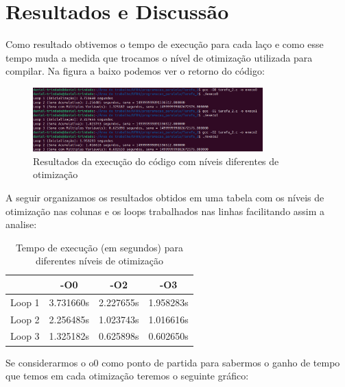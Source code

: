 \documentclass[a4paper, 12pt]{article}
\begin{document}
	\section{Resultados e Discussão}
	
	Como resultado obtivemos o tempo de execução para cada laço e como esse tempo muda a medida que trocamos o nível de otimização utilizada para compilar. Na figura a baixo podemos ver o retorno do código:
	
	\begin{figure}[h]
		\centering
		\includegraphics[width=0.79\textwidth]{resultados.png}
		\caption{Resultados da execução do código com níveis diferentes de otimização}
		\label{figura:exemplo}
	\end{figure}
	
	A seguir organizamos os resultados obtidos em uma tabela com os níveis de otimização nas colunas e os loops trabalhados nas linhas facilitando assim a analise:
	
	\begin{table}[H]
		\centering
		\begin{tabular}{|c|c|c|c|}
			\hline
			\textbf{} & \textbf{-O0} & \textbf{-O2} & \textbf{-O3} \\
			\hline
			Loop 1 & 3.731660s & 2.227655s & 1.958283s \\
			\hline
			Loop 2 & 2.256485s & 1.023743s & 1.016616s \\
			\hline
			Loop 3 & 1.325182s & 0.625898s & 0.602650s \\
			\hline
		\end{tabular}
		\caption{Tempo de execução (em segundos) para diferentes níveis de otimização}
		\label{tab:resultados}
	\end{table}
	
	Se considerarmos o o0 como ponto de partida para sabermos o ganho de tempo que temos em cada otimização teremos o seguinte gráfico:
	
\end{document}
